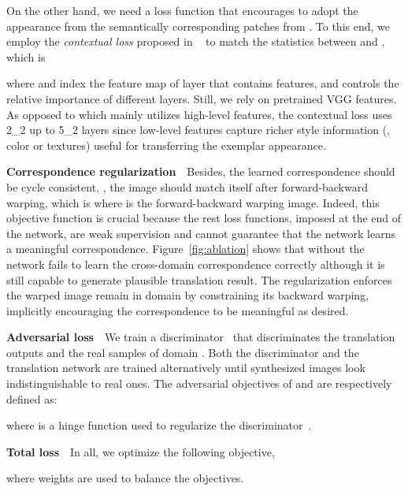 \documentclass[10pt,twocolumn,letterpaper]{article}
\begin{document}
On the other hand, we need a loss function that encourages  to adopt the appearance from the semantically corresponding patches from . To this end, we employ the \emph{contextual loss} proposed in ~\cite{mechrez2018contextual} to match the statistics between  and , which is

where  and  index the feature map of layer  that contains  features, and  controls the relative importance of different layers. Still, we rely on pretrained VGG features. As opposed to  which mainly utilizes high-level features, the contextual loss uses 2\_2 up to 5\_2 layers since low-level features capture richer style information (\eg, color or textures) useful for transferring the exemplar appearance.

\vspace{0.4em}
\noindent\textbf{Correspondence regularization}~~Besides, the learned correspondence should be cycle consistent, \ie, the image should match itself after forward-backward warping, which is  
where  is the forward-backward warping image. Indeed, this objective function is crucial because the rest loss functions, imposed at the end of the network, are weak supervision and cannot guarantee that the network learns a meaningful correspondence. Figure~\ref{fig:ablation} shows that without  the network fails to learn the cross-domain correspondence correctly although it is still capable to generate plausible translation result. The regularization  enforces the warped image  remain in domain  by constraining its backward warping, implicitly encouraging the correspondence to be meaningful as desired. 

\vspace{0.4em}
\noindent\textbf{Adversarial loss}~~We train a discriminator~\cite{goodfellow2014generative} that discriminates the translation outputs and the real samples of domain . Both the discriminator  and the translation network  are trained alternatively until synthesized images look indistinguishable to real ones. The adversarial objectives of  and  are respectively defined as:

where  is a hinge function used to regularize the discriminator~\cite{zhang2018self,brock2018large}. 

\vspace{0.4em}
\noindent\textbf{Total loss}~~In all, we optimize the following objective,

where weights  are used  to balance the objectives. 
\end{document}
